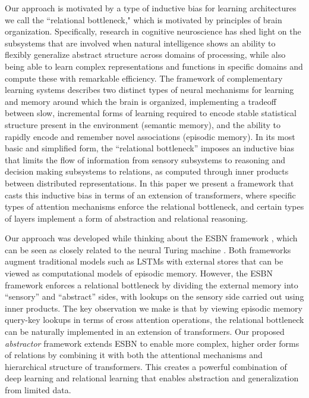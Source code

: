 Our approach is motivated by a type of inductive bias for learning architectures we call the ``relational bottleneck," which is motivated by principles of brain organization. Specifically, research in cognitive neuroscience has 
shed light on the subsystems that are involved when natural intelligence shows an ability to flexibly generalize abstract structure across domains of processing, while also being able to learn complex representations and functions in specific domains and compute these with remarkable efficiency.  The framework of 
complementary learning systems \citep{McClelland:1995, Kumaran:2016} describes two distinct types of neural mechanisms for learning and memory around which the brain is organized, implementing a tradeoff between slow, incremental forms of learning required to encode stable statistical structure present in the environment (semantic memory), and the ability to rapidly encode and remember novel associations (episodic memory). In its most basic and simplified form, the ``relational bottleneck'' imposes an inductive bias that limits the flow of information from sensory subsystems to reasoning and decision making subsystems to relations, as computed through inner products between distributed representations. In this paper we present a framework that casts this inductive bias in terms of 
an extension of transformers, where specific types of attention mechanisms enforce the relational bottleneck, 
and certain types of layers implement a form of abstraction and relational reasoning.

Our approach was developed while thinking about the ESBN framework \citep{esbn}, which can be seen as 
closely related to the neural Turing machine \citep{NTM}. Both frameworks augment traditional models such as 
LSTMs with external stores that can be viewed as computational models of episodic memory. However, the ESBN framework enforces a relational bottleneck by dividing the external memory into ``sensory'' and ``abstract'' sides, with lookups on the sensory side carried out using inner products. The key observation we make is that by viewing episodic  
memory query-key lookups in terms of cross attention operations, the relational bottleneck can be 
naturally implemented in an extension of transformers. Our proposed \textit{abstractor} framework extends ESBN to enable more complex, higher order forms of relations by combining it with both the attentional mechanisms and hierarchical structure of transformers. This creates a powerful combination of deep learning and relational learning that enables abstraction and generalization from limited data.




